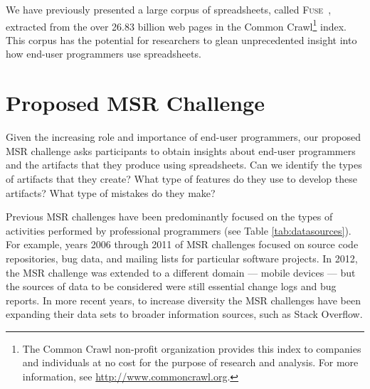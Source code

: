 \documentclass[conference]{IEEEtran}
\begin{document}


We have previously presented a large corpus of spreadsheets, called \textsc{Fuse}~\cite{barik2015}, extracted from the over 26.83 billion web pages in the Common Crawl\footnote{The Common Crawl non-profit organization provides this index to companies and individuals at no cost for the purpose of research and analysis. For more information, see \url{http://www.commoncrawl.org}.} index.
This corpus has the potential for researchers to glean unprecedented insight into how end-user programmers use spreadsheets.

%
%



\section{Proposed MSR Challenge}

Given the increasing role and importance of end-user programmers, our proposed MSR challenge asks participants to obtain insights about end-user programmers and the artifacts that they produce using spreadsheets. 
Can we identify the types of artifacts that they create? What type of features do they use to develop these artifacts? What type of mistakes do they make?

Previous MSR challenges have been predominantly focused on the types of activities performed by professional programmers (see Table \ref{tab:datasources}). 
For example, years 2006 through 2011 of MSR challenges focused on source code repositories, bug data, and mailing lists for particular software projects. 
In 2012, the MSR challenge was extended to a different domain --- mobile devices --- but the sources of data to be considered were still essential change logs and bug reports. 
In more recent years, to increase diversity the MSR challenges have been expanding their data sets to broader information sources, such as Stack Overflow.
\end{document}
